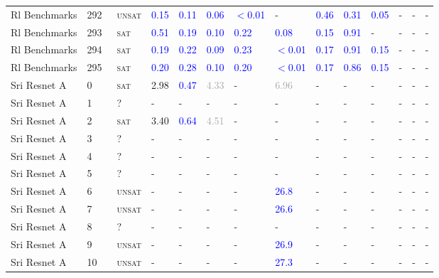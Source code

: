 \begin{center}
{\begin{longtable}{@{}llllllllllllll@{}}
Rl Benchmarks & 292 & ~\textsc{unsat} & \textcolor{blue}{0.15} & \textcolor{blue}{0.11} & \textcolor{blue}{0.06} & \textcolor{blue}{$<$0.01} & - & \textcolor{blue}{0.46} & \textcolor{blue}{0.31} & \textcolor{blue}{0.05} & - & - & - \\
Rl Benchmarks & 293 & ~\textsc{sat} & \textcolor{blue}{0.51} & \textcolor{blue}{0.19} & \textcolor{blue}{0.10} & \textcolor{blue}{0.22} & \textcolor{blue}{0.08} & \textcolor{blue}{0.15} & \textcolor{blue}{0.91} & - & - & - & - \\
Rl Benchmarks & 294 & ~\textsc{sat} & \textcolor{blue}{0.19} & \textcolor{blue}{0.22} & \textcolor{blue}{0.09} & \textcolor{blue}{0.23} & \textcolor{blue}{$<$0.01} & \textcolor{blue}{0.17} & \textcolor{blue}{0.91} & \textcolor{blue}{0.15} & - & - & - \\
Rl Benchmarks & 295 & ~\textsc{sat} & \textcolor{blue}{0.20} & \textcolor{blue}{0.28} & \textcolor{blue}{0.10} & \textcolor{blue}{0.20} & \textcolor{blue}{$<$0.01} & \textcolor{blue}{0.17} & \textcolor{blue}{0.86} & \textcolor{blue}{0.15} & - & - & - \\
\midrule
Sri Resnet A & 0 & ~\textsc{sat} & \textcolor{second}{2.98} & \textcolor{blue}{0.47} & \textcolor{darkgray}{4.33} & - & \textcolor{darkgray}{6.96} & - & - & - & - & - & - \\
Sri Resnet A & 1 & ~? & - & - & - & - & - & - & - & - & - & - & - \\
Sri Resnet A & 2 & ~\textsc{sat} & \textcolor{second}{3.40} & \textcolor{blue}{0.64} & \textcolor{darkgray}{4.51} & - & - & - & - & - & - & - & - \\
Sri Resnet A & 3 & ~? & - & - & - & - & - & - & - & - & - & - & - \\
Sri Resnet A & 4 & ~? & - & - & - & - & - & - & - & - & - & - & - \\
Sri Resnet A & 5 & ~? & - & - & - & - & - & - & - & - & - & - & - \\
Sri Resnet A & 6 & ~\textsc{unsat} & - & - & - & - & \textcolor{blue}{26.8} & - & - & - & - & - & - \\
Sri Resnet A & 7 & ~\textsc{unsat} & - & - & - & - & \textcolor{blue}{26.6} & - & - & - & - & - & - \\
Sri Resnet A & 8 & ~? & - & - & - & - & - & - & - & - & - & - & - \\
Sri Resnet A & 9 & ~\textsc{unsat} & - & - & - & - & \textcolor{blue}{26.9} & - & - & - & - & - & - \\
Sri Resnet A & 10 & ~\textsc{unsat} & - & - & - & - & \textcolor{blue}{27.3} & - & - & - & - & - & - \\

\end{longtable}}
\end{center}
